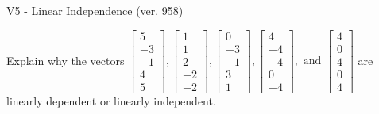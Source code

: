 \begin{exercise}
  \begin{exerciseTitle}V5 - Linear Independence (ver. 958)\end{exerciseTitle}
  \begin{exerciseStatement}
    Explain why the vectors \(\left[\begin{array}{r}
5 \\
-3 \\
-1 \\
4 \\
5
\end{array}\right] , \left[\begin{array}{r}
1 \\
1 \\
2 \\
-2 \\
-2
\end{array}\right] , \left[\begin{array}{r}
0 \\
-3 \\
-1 \\
3 \\
1
\end{array}\right] , \left[\begin{array}{r}
4 \\
-4 \\
-4 \\
0 \\
-4
\end{array}\right] , \text{ and } \left[\begin{array}{r}
4 \\
0 \\
4 \\
0 \\
4
\end{array}\right]\) are linearly dependent or linearly independent.	



\end{exerciseStatement}
\end{exercise}
